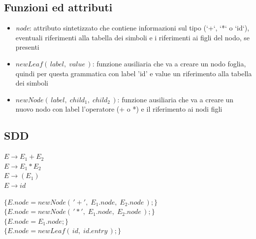 \documentclass[11pt]{article}
\begin{document}
\subsection{Funzioni ed attributi}
\begin{itemize}
  \item \textit{node}: attributo sintetizzato che contiene informazioni sul tipo 
  (`+`, `*` o `id`), eventuali riferimenti alla tabella dei simboli e i 
  riferimenti ai figli del nodo, se presenti
  \item $newLeaf(\,label,\; value\,)$: funzione ausiliaria che va a creare 
  un nodo foglia, quindi per questa grammatica con label 'id' e value un 
  riferimento alla tabella dei simboli
  \item $newNode(\, label,\; child_1,\; child_2\,)$: funzione ausiliaria che 
  va a creare un nuovo nodo con label l'operatore (+ o *) e il riferimento
  ai nodi figli
\end{itemize}
\subsection{SDD}
\begin{center}
  \begin{minipage}[t]{0.29\linewidth}
    $E \rightarrow E_1 + E_2$ \\
    $E \rightarrow E_1 * E_2$ \\
    $E \rightarrow (E_1)$     \\
    $E \rightarrow id$     
  \end{minipage}
  \hspace{0.2cm}
  \begin{minipage}[t]{0.5\linewidth}
    \raggedright
    $\{E.node = newNode(\,'+',\; E_1.node,\; E_2.node\,);\}$ \\
    $\{E.node = newNode(\,'*',\; E_1.node,\; E_2.node\,);\}$ \\
    $\{E.node = E_1.node;\}$ \\
    $\{E.node = newLeaf(\,id,\; id.entry\,);\}$ \\
  \end{minipage}
  \hspace{0.2cm}
\end{center}
\end{document}
